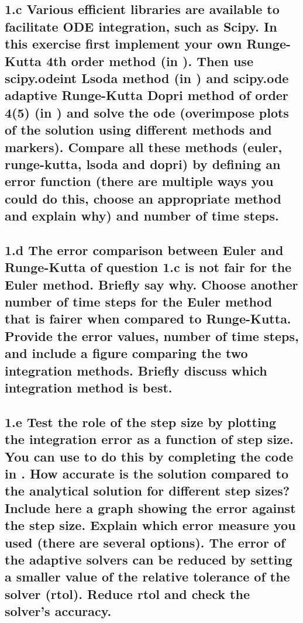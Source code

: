 \documentclass{cmc}
\begin{document}
\vspace{0.3\textheight}



\clearpage

\subsection*{1.c Various efficient libraries are available to facilitate ODE
  integration, such as Scipy. In this exercise first implement your own Runge-Kutta 4th order
  method (in ). %
  Then use scipy.odeint Lsoda method (in ) %
  and scipy.ode adaptive Runge-Kutta Dopri method of order 4(5) (in ) %
  and solve the ode (overimpose plots of the solution using different methods and markers).
  Compare all these methods (euler, runge-kutta, lsoda and dopri) by defining an error
  function (there are multiple ways you could do this, choose an appropriate method
  and explain why) and number of time steps.
  }



\vspace{0.3\textheight}



\clearpage

\subsection*{1.d The error comparison between Euler and Runge-Kutta of question 1.c is
  not fair for the Euler method.  Briefly say why. Choose another number of time
  steps for the Euler method that is fairer when compared to
  Runge-Kutta. Provide the error values, number of time steps, and include a
  figure comparing the two integration methods. Briefly discuss which
  integration method is best.}



\vspace{0.3\textheight}



\clearpage

\subsection*{1.e Test the role of the step size by plotting the integration
  error as a function of step size. You can use
  to do this by completing the code in
  . %
  How accurate is the solution compared to the analytical solution for different
  step sizes?  Include here a graph showing the error against the step
  size. Explain which error measure you used (there are several options). The error of
  the adaptive solvers can be reduced by setting a smaller value of the relative
  tolerance of the solver (rtol). Reduce rtol and check the solver's accuracy. }
\end{document}
